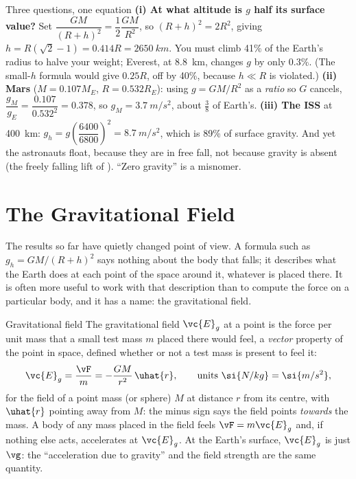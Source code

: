 \begin{exbox}{Three questions, one equation}
\textbf{(i) At what altitude is $g$ half its surface value?} Set $\dfrac{GM}{(R+h)^2}=\dfrac12\dfrac{GM}{R^2}$,
so $(R+h)^2=2R^2$, giving $h=R(\sqrt2-1)=0.414R=\SI{2650}{km}$. You must climb 41\% of the Earth's radius
to halve your weight; Everest, at \SI{8.8}{km}, changes $g$ by only 0.3\%. (The small-$h$
formula would give $0.25R$, off by 40\%, because $h\ll R$ is violated.)
\textbf{(ii) Mars} ($M=0.107M_E$, $R=0.532R_E$): using $g=GM/R^2$ as a \emph{ratio} so $G$ cancels,
$\dfrac{g_M}{g_E}=\dfrac{0.107}{0.532^2}=0.378$, so $g_M=\SI{3.7}{m/s^2}$, about $\tfrac{3}{8}$ of Earth's.
\textbf{(iii) The ISS} at \SI{400}{km}: $g_h=g\left(\dfrac{6400}{6800}\right)^2=\SI{8.7}{m/s^2}$, which is
89\% of surface gravity. And yet the astronauts float, because they are in free fall, not because
gravity is absent (the freely falling lift of ). ``Zero gravity'' is a misnomer.
\end{exbox}

\section{The Gravitational Field}\label{sec:field}

The results so far have quietly changed point of view. A formula such as $g_h=GM/(R+h)^2$ says
nothing about the body that falls; it describes what the Earth does at each point of the space around
it, whatever is placed there. It is often more useful to work with that description than to compute
the force on a particular body, and it has a name: the gravitational field.

\begin{defbox}{Gravitational field}
The gravitational field $\vc{E}_g$ at a point is the force per unit mass that a small test mass $m$
placed there would feel, a \emph{vector} property of the point in space, defined whether or not a test
mass is present to feel it:
\[
\vc{E}_g=\frac{\vF}{m}=-\frac{GM}{r^2}\,\uhat{r},\qquad\text{units }\si{N/kg}=\si{m/s^2},
\]
for the field of a point mass (or sphere) $M$ at distance $r$ from its centre, with $\uhat{r}$ pointing
away from $M$: the minus sign says the field points \emph{towards} the mass. A body of any mass placed
in the field feels $\vF=m\vc{E}_g$ and, if nothing else acts, accelerates at $\vc{E}_g$. At the
Earth's surface, $\vc{E}_g$ is just $\vg$: the ``acceleration due to gravity'' and the field strength
are the same quantity.
\end{defbox}

